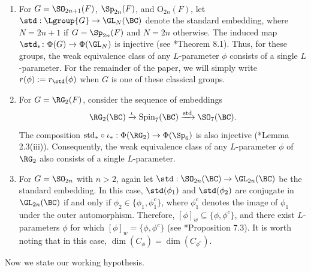 \documentclass[11pt,letterpaper]{amsart}
\numberwithin{equation}{section}
\begin{document}
\begin{remark}\label{rmk weakly equivalent}\ 
    \begin{enumerate}
        \item For $G= \SO_{2n+1}(F)$, $\Sp_{2n}(F)$, and $\mathrm{O}_{2n}(F)$, let $\std: \Lgroup{G} \to \GL_{N}(\BC)$ denote the standard embedding, where $N=2n+1$ if $G=\Sp_{2n}(F)$ and $N=2n$ otherwise. The induced map $\std_*\colon \Phi(G) \to \Phi(\GL_N)$ is injective \textnormal{(see \cite{GGP12}*{Theorem 8.1})}. Thus, for these groups, the weak equivalence class of any $L$-parameter $\phi$ consists of a single $L$-parameter. For the remainder of the paper, we will simply write $r(\phi) := r_{\std}(\phi)$ when $G$ is one of these classical groups.
        \item For $G=\RG_2(F)$, consider the sequence of embeddings
        \[
            \RG_2(\BC) \xrightarrow{\iota} \mathrm{Spin}_7(\BC) \xrightarrow{\mathrm{std}} \SO_{7}(\BC).
        \]
        The composition $\mathrm{std}_* \circ \iota_* : \Phi(\RG_2) \to \Phi(\Sp_6)$ is also injective \textnormal{(\cite{GS23}*{Lemma 2.3(iii)})}. Consequently, the weak equivalence class of any $L$-parameter $\phi$ of $\RG_2$ also consists of a single $L$-parameter.
        \item For $G=\SO_{2n}$ with $n > 2$, again let $\std: \SO_{2n}(\BC) \to \GL_{2n}(\BC)$ be the standard embedding. In this case, $\std(\phi_1)$ and $\std(\phi_2)$ are conjugate in $\GL_{2n}(\BC)$ if and only if $\phi_2 \in \{\phi_1, \phi_1^{c}\}$, where $\phi_1^c$ denotes the image of $\phi_1$ under the outer automorphism. Therefore, $[\phi]_w \subseteq \{\phi, \phi^c\}$, and there exist $L$-parameters $\phi$ for which $[\phi]_w = \{\phi, \phi^c\}$ \textnormal{(see \cite{Mat24}*{Proposition 7.3})}. It is worth noting that in this case, $\dim(C_{\phi}) = \dim(C_{\phi^c})$. 
    \end{enumerate}
\end{remark}

Now we state our working hypothesis.
\end{document}
